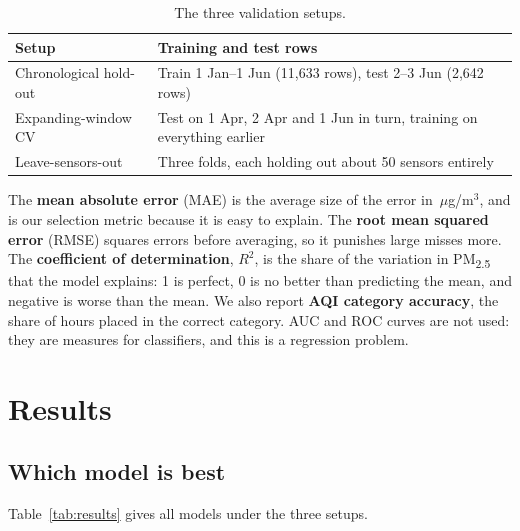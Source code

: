 \documentclass{ieeeaccess}
\newcommand{\ugm}{\,$\mu$g/m$^{3}$}
\newcommand{\pmtwo}{PM\textsubscript{2.5}}
\begin{document}
\begin{table}[t]
\caption{The three validation setups.}
\label{tab:valid}
\centering
\small
\begin{tabularx}{\columnwidth}{l L}
\toprule
Setup & Training and test rows \\
\midrule
Chronological hold-out & Train 1 Jan--1 Jun (11{,}633 rows), test 2--3 Jun (2{,}642 rows) \\
Expanding-window CV & Test on 1 Apr, 2 Apr and 1 Jun in turn, training on everything earlier \\
Leave-sensors-out & Three folds, each holding out about 50 sensors entirely \\
\bottomrule
\end{tabularx}
\end{table}

The \textbf{mean absolute error} (MAE) is the average size of the error in \ugm{}, and is our selection metric because it is easy to explain. The \textbf{root mean squared error} (RMSE) squares errors before averaging, so it punishes large misses more. The \textbf{coefficient of determination}, $R^2$, is the share of the variation in \pmtwo{} that the model explains: 1 is perfect, 0 is no better than predicting the mean, and negative is worse than the mean. We also report \textbf{AQI category accuracy}, the share of hours placed in the correct category. AUC and ROC curves are not used: they are measures for classifiers, and this is a regression problem.

\section{Results}
\label{sec:results}

\subsection{Which model is best}
Table~\ref{tab:results} gives all models under the three setups.
\end{document}
